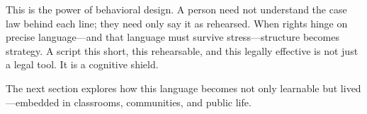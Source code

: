 This is the power of behavioral design. A person need not understand the case law behind each line; they need only say it as rehearsed. When rights hinge on precise language—and that language must survive stress—structure becomes strategy. A script this short, this rehearsable, and this legally effective is not just a legal tool. It is a cognitive shield.

The next section explores how this language becomes not only learnable but lived—embedded in classrooms, communities, and public life.
